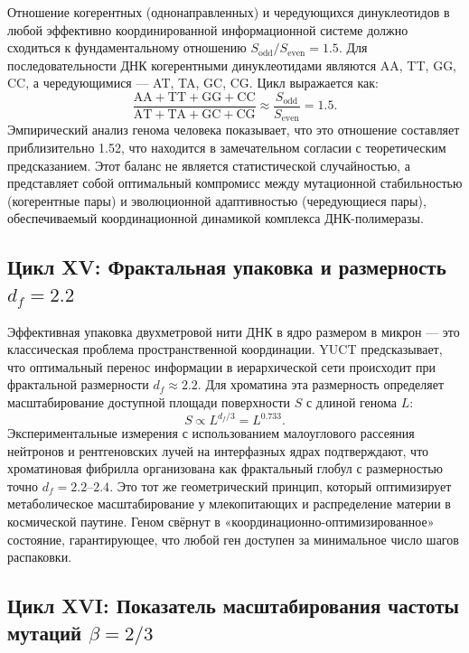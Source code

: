 \documentclass[12pt]{article}
\begin{document}
	Отношение когерентных (однонаправленных) и чередующихся динуклеотидов в любой эффективно координированной информационной системе должно сходиться к фундаментальному отношению $S_{\mathrm{odd}}/S_{\mathrm{even}} = 1.5$. Для последовательности ДНК когерентными динуклеотидами являются AA, TT, GG, CC, а чередующимися — AT, TA, GC, CG. Цикл выражается как:
	\begin{equation}
		\boxed{ \frac{\text{AA} + \text{TT} + \text{GG} + \text{CC}}{\text{AT} + \text{TA} + \text{GC} + \text{CG}} \approx \frac{S_{\mathrm{odd}}}{S_{\mathrm{even}}} = 1.5 }.
	\end{equation}
	Эмпирический анализ генома человека показывает, что это отношение составляет приблизительно 1.52, что находится в замечательном согласии с теоретическим предсказанием. Этот баланс не является статистической случайностью, а представляет собой оптимальный компромисс между мутационной стабильностью (когерентные пары) и эволюционной адаптивностью (чередующиеся пары), обеспечиваемый координационной динамикой комплекса ДНК-полимеразы.
	
	\subsection{Цикл XV: Фрактальная упаковка и размерность $d_f = 2.2$}
	
	Эффективная упаковка двухметровой нити ДНК в ядро размером в микрон — это классическая проблема пространственной координации. YUCT предсказывает, что оптимальный перенос информации в иерархической сети происходит при фрактальной размерности $d_f \approx 2.2$. Для хроматина эта размерность определяет масштабирование доступной площади поверхности $S$ с длиной генома $L$:
	\begin{equation}
		\boxed{ S \propto L^{d_f/3} = L^{0.733} }.
	\end{equation}
	Экспериментальные измерения с использованием малоуглового рассеяния нейтронов и рентгеновских лучей на интерфазных ядрах подтверждают, что хроматиновая фибрилла организована как фрактальный глобул с размерностью точно $d_f = 2.2$–$2.4$. Это тот же геометрический принцип, который оптимизирует метаболическое масштабирование у млекопитающих и распределение материи в космической паутине. Геном свёрнут в «координационно-оптимизированное» состояние, гарантирующее, что любой ген доступен за минимальное число шагов распаковки.
	
	\subsection{Цикл XVI: Показатель масштабирования частоты мутаций $\beta = 2/3$}
	
\end{document}
